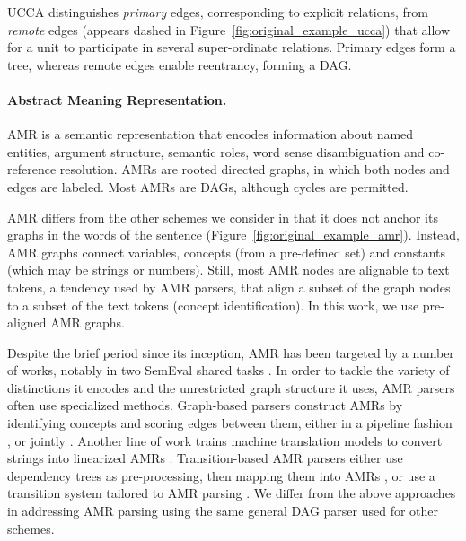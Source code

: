 \documentclass[11pt,a4paper]{article}
\begin{document}
UCCA distinguishes \textit{primary} edges, corresponding 
to explicit relations, from \textit{remote} edges (appears dashed in
Figure~\ref{fig:original_example_ucca}) that allow for a unit to participate
in several super-ordinate relations.
Primary edges form a tree, whereas remote edges enable reentrancy, forming a DAG.

\paragraph{Abstract Meaning Representation.}\label{sec:amr}

AMR \cite{banarescu2013abstract} is a semantic representation that encodes information about named entities, 
argument structure, semantic roles, word sense disambiguation and co-reference resolution.
AMRs are rooted directed graphs, in which both nodes and edges are labeled.
Most AMRs are DAGs, although cycles are permitted.

AMR differs from the other schemes we consider in that it does not anchor its graphs
in the words of the sentence (Figure~\ref{fig:original_example_amr}). Instead, AMR graphs
connect variables, concepts (from a pre-defined set) and constants (which may be strings or numbers).
Still, most AMR nodes are alignable to text tokens, a tendency used by AMR parsers,
that align a subset of the graph nodes to a subset of the text tokens (concept identification). In this work, we use pre-aligned AMR graphs.

Despite the brief period since its inception, AMR has been targeted by a number of works,
notably in two SemEval shared tasks \cite{may2016semeval,may2017semeval}.
In order to tackle the variety of distinctions it encodes and the unrestricted graph structure
it uses, AMR parsers often use specialized methods.
Graph-based parsers construct AMRs
by identifying concepts and scoring edges between them, either in a pipeline fashion
\cite{flanigan2014discriminative,artzi2015broad,pust2015parsing,foland2017abstract},
or jointly \cite{zhou2016amr}.
Another line of work %
trains machine translation models to convert strings into linearized AMRs
\cite{barzdins2016riga,Gildea2017AddressingTD,Konstas2017NeuralAS,Buys2017RobustIN}.
Transition-based AMR parsers either 
use dependency trees as pre-processing, then mapping them into AMRs
\cite{wang-xue-pradhan:2015:ACL-IJCNLP,wang2015transition,wang-EtAl:2016:SemEval,goodman2016noise},
or use a transition system tailored to AMR parsing \cite{damonte-17,D17-1130}.
We differ from the above approaches in addressing AMR parsing 
using the same general DAG parser used for other schemes.
\end{document}

